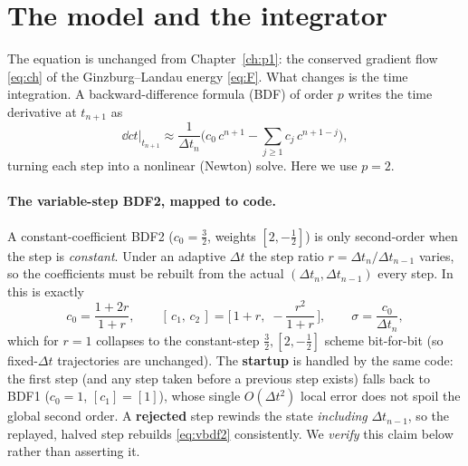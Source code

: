 \section{The model and the integrator}

The equation is unchanged from Chapter~\ref{ch:p1}: the conserved
gradient flow \eqref{eq:ch} of the Ginzburg--Landau energy \eqref{eq:F}.
What changes is the time integration. A backward-difference formula (BDF)
of order $p$ writes the time derivative at $t_{n+1}$ as
%
\begin{equation}
  \dd{c}{t}\Big|_{t_{n+1}} \approx \frac{1}{\Delta t_n}\Big(c_0\,c^{n+1}
  - \sum_{j\ge1} c_j\,c^{n+1-j}\Big),
  \label{eq:bdf}
\end{equation}
%
turning each step into a nonlinear (Newton) solve. Here we use $p=2$.

\paragraph{The variable-step BDF2, mapped to code.} A constant-coefficient
BDF2 ($c_0=\tfrac32$, weights $[2,-\tfrac12]$) is only second-order when
the step is \emph{constant}. Under an adaptive $\Delta t$ the step ratio
$r=\Delta t_n/\Delta t_{n-1}$ varies, so the coefficients must be rebuilt
from the actual $(\Delta t_n,\Delta t_{n-1})$ every step. In
 this is exactly
%
\begin{equation}
  c_0 = \frac{1+2r}{1+r},\qquad
  [\,c_1,\,c_2\,] = \Big[\,1+r,\; -\frac{r^2}{1+r}\,\Big],\qquad
  \sigma=\frac{c_0}{\Delta t_n},
  \label{eq:vbdf2}
\end{equation}
%
which for $r=1$ collapses to the constant-step $\tfrac32,[2,-\tfrac12]$
scheme bit-for-bit (so fixed-$\Delta t$ trajectories are unchanged). The
\textbf{startup} is handled by the same code: the first step (and any
step taken before a previous step exists) falls back to BDF1
($c_0=1$, $[c_1]=[1]$), whose single $O(\Delta t^2)$ local error does not
spoil the global second order. A \textbf{rejected} step rewinds the state
\emph{including} $\Delta t_{n-1}$, so the replayed, halved step rebuilds
\eqref{eq:vbdf2} consistently. We \emph{verify} this claim below rather
than asserting it.

